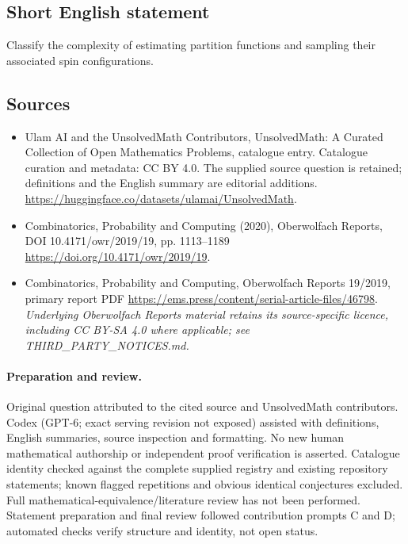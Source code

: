 \documentclass[11pt]{article}
\begin{document}
\subsection{Short English statement}
Classify the complexity of estimating partition functions and sampling their associated spin configurations.
\subsection{Sources}
\begin{itemize}
\item[\hypertarget{source:statement:1}{S1}] Ulam AI and the UnsolvedMath Contributors, UnsolvedMath: A Curated Collection of Open Mathematics Problems, catalogue entry. Catalogue curation and metadata: CC BY 4.0. The supplied source question is retained; definitions and the English summary are editorial additions.
\url{https://huggingface.co/datasets/ulamai/UnsolvedMath}.
\item[\hypertarget{source:statement:2}{S2}] Combinatorics, Probability and Computing (2020), Oberwolfach Reports, DOI 10.4171/owr/2019/19, pp. 1113--1189
\url{https://doi.org/10.4171/owr/2019/19}.
\item[\hypertarget{source:statement:3}{S3}] Combinatorics, Probability and Computing, Oberwolfach Reports 19/2019, primary report PDF
\url{https://ems.press/content/serial-article-files/46798}.
\textit{Underlying Oberwolfach Reports material retains its source-specific licence, including CC BY-SA 4.0 where applicable; see THIRD\_PARTY\_NOTICES.md.}
\end{itemize}
\paragraph{Preparation and review.}
Original question attributed to the cited source and UnsolvedMath contributors. Codex (GPT-6; exact serving revision not exposed) assisted with definitions, English summaries, source inspection and formatting. No new human mathematical authorship or independent proof verification is asserted. Catalogue identity checked against the complete supplied registry and existing repository statements; known flagged repetitions and obvious identical conjectures excluded. Full mathematical-equivalence/literature review has not been performed. Statement preparation and final review followed contribution prompts C and D; automated checks verify structure and identity, not open status.
\label{end:statement}
\end{document}
